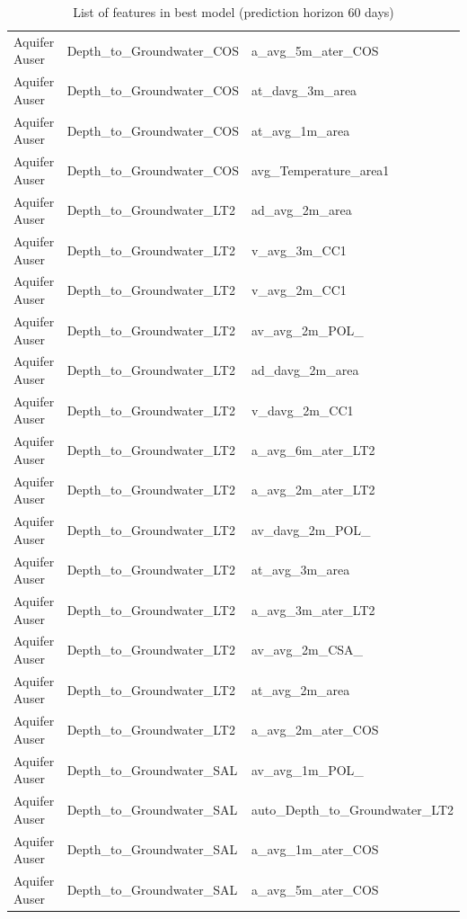 \documentclass{article}
\begin{document}
\begin{table}
{\begin{tabular}{lll}
      Aquifer Auser &   Depth\_to\_Groundwater\_COS &               a\_avg\_5m\_ater\_COS \\
      Aquifer Auser &   Depth\_to\_Groundwater\_COS &                 at\_davg\_3m\_area \\
      Aquifer Auser &   Depth\_to\_Groundwater\_COS &                  at\_avg\_1m\_area \\
      Aquifer Auser &   Depth\_to\_Groundwater\_COS &           avg\_Temperature\_area1 \\
      Aquifer Auser &   Depth\_to\_Groundwater\_LT2 &                  ad\_avg\_2m\_area \\
      Aquifer Auser &   Depth\_to\_Groundwater\_LT2 &                    v\_avg\_3m\_CC1 \\
      Aquifer Auser &   Depth\_to\_Groundwater\_LT2 &                    v\_avg\_2m\_CC1 \\
      Aquifer Auser &   Depth\_to\_Groundwater\_LT2 &                  av\_avg\_2m\_POL\_ \\
      Aquifer Auser &   Depth\_to\_Groundwater\_LT2 &                 ad\_davg\_2m\_area \\
      Aquifer Auser &   Depth\_to\_Groundwater\_LT2 &                   v\_davg\_2m\_CC1 \\
      Aquifer Auser &   Depth\_to\_Groundwater\_LT2 &               a\_avg\_6m\_ater\_LT2 \\
      Aquifer Auser &   Depth\_to\_Groundwater\_LT2 &               a\_avg\_2m\_ater\_LT2 \\
      Aquifer Auser &   Depth\_to\_Groundwater\_LT2 &                 av\_davg\_2m\_POL\_ \\
      Aquifer Auser &   Depth\_to\_Groundwater\_LT2 &                  at\_avg\_3m\_area \\
      Aquifer Auser &   Depth\_to\_Groundwater\_LT2 &               a\_avg\_3m\_ater\_LT2 \\
      Aquifer Auser &   Depth\_to\_Groundwater\_LT2 &                  av\_avg\_2m\_CSA\_ \\
      Aquifer Auser &   Depth\_to\_Groundwater\_LT2 &                  at\_avg\_2m\_area \\
      Aquifer Auser &   Depth\_to\_Groundwater\_LT2 &               a\_avg\_2m\_ater\_COS \\
      Aquifer Auser &   Depth\_to\_Groundwater\_SAL &                  av\_avg\_1m\_POL\_ \\
      Aquifer Auser &   Depth\_to\_Groundwater\_SAL &   auto\_Depth\_to\_Groundwater\_LT2 \\
      Aquifer Auser &   Depth\_to\_Groundwater\_SAL &               a\_avg\_1m\_ater\_COS \\
      Aquifer Auser &   Depth\_to\_Groundwater\_SAL &               a\_avg\_5m\_ater\_COS \\

\bottomrule
\end{tabular}}
\caption{List of features in best model (prediction horizon 60 days)}
\label{tab:feats1}
\end{table}
\end{document}
